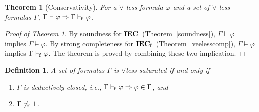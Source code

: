 \documentclass[doctor]{iscs-thesis}
\newcommand{\iec}{{\rm {\textbf{IEC}}}}
\newtheorem{definition}{Definition}
\newtheorem{theorem}{Theorem}
\begin{document}
\begin{theorem}[Conservativity]
\label{conservativity}
 For a $\vee$-less formula $\varphi$ and a set of $\vee$-less formulas $\Gamma$,
 $\Gamma\vdash \varphi\Rightarrow \Gamma\vdash_{\kern -1pt\mathbf f} \varphi$.
\end{theorem}
\begin{proof}[Proof of Theorem \ref{conservativity}]
 By soundness for $\iec$~(Theorem~\ref{soundness}), $\Gamma\vdash\varphi$ implies $\Gamma\models \varphi$.
 By strong completeness for $\iecn$~(Theorem~\ref{veelesscomp}),
 $\Gamma\models\varphi$ implies $\Gamma\vdash_{\kern -1pt\mathbf f} \varphi$.
 The theorem is proved by combining these two implication.
\end{proof}

\begin{definition}
 A set of formulas $\Gamma$ is \textit{$\vee$less-saturated} if and only if
\begin{enumerate}
 \item $\Gamma$ is deductively closed, i.e., $\Gamma\vdash_{\kern -1pt\mathbf f}\varphi\Rightarrow
       \varphi\in\Gamma$, and
 \item $\Gamma\not\vdash_{\kern -1pt\mathbf f}\bot$.
\end{enumerate}
\end{definition}
\end{document}
